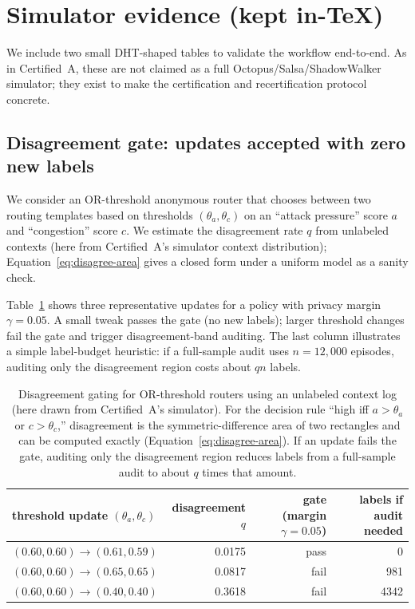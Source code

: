 \documentclass[11pt]{article}
\begin{document}
\section{Simulator evidence (kept in-\TeX)}
We include two small DHT-shaped tables to validate the workflow end-to-end.
As in Certified~A, these are not claimed as a full Octopus/Salsa/ShadowWalker simulator; they exist to make the certification and recertification protocol concrete.

\subsection{Disagreement gate: updates accepted with zero new labels}
We consider an OR-threshold anonymous router that chooses between two routing templates based on thresholds $(\theta_a,\theta_c)$ on an ``attack pressure'' score $a$ and ``congestion'' score $c$.
We estimate the disagreement rate $q$ from unlabeled contexts (here from Certified~A's simulator context distribution); Equation~\eqref{eq:disagree-area} gives a closed form under a uniform model as a sanity check.

Table~\ref{tab:gate-toy} shows three representative updates for a policy with privacy margin $\gamma=0.05$.
A small tweak passes the gate (no new labels); larger threshold changes fail the gate and trigger disagreement-band auditing.
The last column illustrates a simple label-budget heuristic: if a full-sample audit uses $n=12{,}000$ episodes, auditing only the disagreement region costs about $q n$ labels.

\begin{table}[t]
\centering
\begin{tabular}{@{}lrrr@{}}
\toprule
threshold update $(\theta_a,\theta_c)$ & disagreement $q$ & gate (margin $\gamma=0.05$) & labels if audit needed \\
\midrule
$(0.60,0.60)\to(0.61,0.59)$ & 0.0175 & pass & 0 \\
$(0.60,0.60)\to(0.65,0.65)$ & 0.0817 & fail & 981 \\
$(0.60,0.60)\to(0.40,0.40)$ & 0.3618 & fail & 4342 \\
\bottomrule
\end{tabular}
\caption{Disagreement gating for OR-threshold routers using an unlabeled context log (here drawn from Certified~A's simulator).
For the decision rule ``high iff $a>\theta_a$ or $c>\theta_c$,'' disagreement is the symmetric-difference area of two rectangles and can be computed exactly (Equation~\eqref{eq:disagree-area}).
If an update fails the gate, auditing only the disagreement region reduces labels from a full-sample audit to about $q$ times that amount.}
\label{tab:gate-toy}
\end{table}
\end{document}
